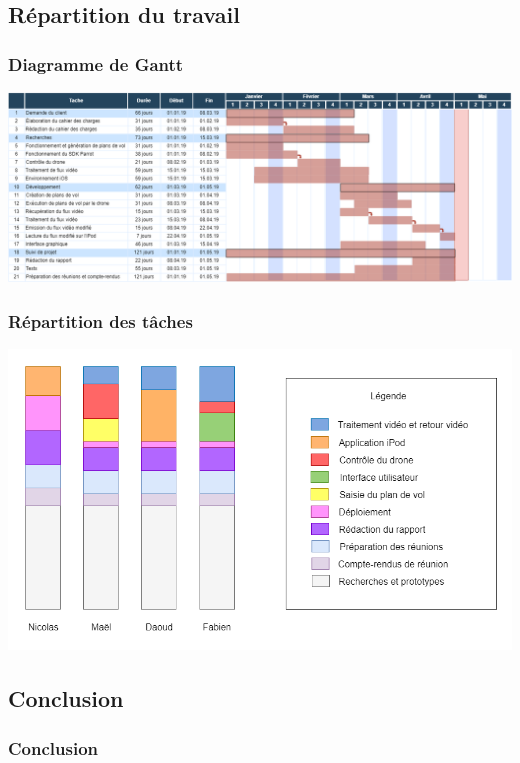 \documentclass{beamer}
\begin{document}
	
	\begin{frame}
		\section{Répartition du travail}
		\begin{center}
		\frametitle{Diagramme de Gantt}
        \includegraphics[scale=0.26]{gantt.png}
		\end{center}
	\end{frame}

	
	\begin{frame}
		\begin{center}
		\frametitle{Répartition des tâches}
        \includegraphics[scale=0.3]{repartition_taches.png}
		\end{center}
	\end{frame}

	
	\begin{frame}
	    \section{Conclusion}
		\begin{center}
		\frametitle{Conclusion}
		\end{center}
	\end{frame}



	
\end{document}
